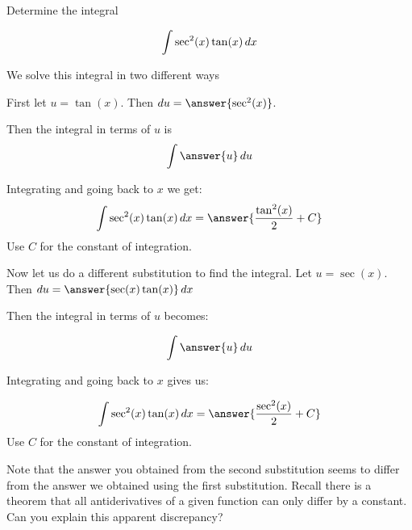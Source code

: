 \documentclass{ximera}
\author{Jason Miller}
\begin{document}
\begin{exercise}
Determine the integral

\[
\int \sec^{2}(x) \tan(x) \mathop{}\!d x
\]

We solve this integral in two different ways


First let $u=\tan(x)$. Then $\d u=\answer{ \sec^{2}(x)}$. 

Then the integral in terms of $u$ is
\[
\int \answer{u} \d u
\]

Integrating and going back to $x$ we get:
\[
\int \sec^{2}(x)\tan(x) \d x= \answer{  \frac{ \tan^{2}(x)}{2}  + C}
\]
Use $C$ for the constant of integration. 

\begin{exercise}

Now let us do a different substitution to find the integral. Let $u=\sec(x)$. Then $\d u=\answer{ \sec(x) \tan(x)} \d x$

Then the integral in terms of $u$ becomes:

\[
\int \answer{u} \d u 
\]

Integrating and going back to $x$ gives us:

\[
\int \sec^{2}(x) \tan(x) \d x= \answer{  \frac{ \sec^{2}(x) }{2}+ C}
\]
Use $C$ for the constant of integration. 

Note that the answer you obtained from the second substitution seems to differ from the answer we obtained using the first substitution. Recall there is a theorem that all antiderivatives 
of a given function can only differ by a constant. Can you explain this apparent discrepancy?
\end{exercise}



\end{exercise}
\end{document}
